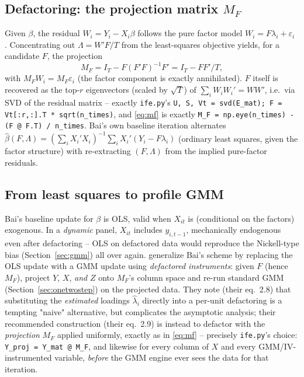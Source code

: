 \documentclass[11pt,a4paper]{article}
\begin{document}
\subsection{\texorpdfstring{Defactoring: the projection matrix $M_F$}{Defactoring: the projection matrix M\_F}}

Given $\beta$, the residual $W_i=Y_i-X_i\beta$ follows the pure factor model
$W_i=F\lambda_i+\varepsilon_i$ \citep[eq.\ 9]{Bai2009}. Concentrating out
$\Lambda=W'F/T$ from the least-squares objective yields, for a candidate
$F$, the projection
\begin{equation}
  M_F = I_T - F(F'F)^{-1}F' = I_T - FF'/T, \label{eq:mf}
\end{equation}
\citep[Section 3.2]{Bai2009} with $M_FW_i=M_F\varepsilon_i$ (the factor
component is exactly annihilated). $F$ itself is recovered as the top-$r$
eigenvectors (scaled by $\sqrt T$) of $\sum_iW_iW_i' = WW'$, i.e.\ via SVD of
the residual matrix -- exactly \texttt{ife.py}'s
\texttt{U, S, Vt = svd(E\_mat); F = Vt[:r,:].T * sqrt(n\_times)}, and
\eqref{eq:mf} is exactly \texttt{M\_F = np.eye(n\_times) - (F @ F.T) / n\_times}.
Bai's own baseline iteration alternates
$\hat\beta(F,\Lambda)=\left(\sum_iX_i'X_i\right)^{-1}\sum_iX_i'(Y_i-F\lambda_i)$
(ordinary least squares, given the factor structure) with re-extracting
$(F,\Lambda)$ from the implied pure-factor residuals.

\subsection{From least squares to profile GMM}

Bai's baseline update for $\beta$ is OLS, valid when $X_{it}$ is (conditional
on the factors) exogenous. In a \emph{dynamic} panel, $X_{it}$ includes
$y_{i,t-1}$, mechanically endogenous even after defactoring -- OLS on
defactored data would reproduce the Nickell-type bias
(Section~\ref{sec:gmm}) all over again. \citet{HongSuJiang2022} generalize
Bai's scheme by replacing the OLS update with a GMM update using
\emph{defactored instruments}: given $F$ (hence $M_F$), project $Y$, $X$,
\emph{and} $Z$ onto $M_F$'s column space and re-run standard GMM
(Section~\ref{sec:onetwostep}) on the projected data. They note (their eq.\
2.8) that substituting the \emph{estimated} loadings $\hat\lambda_i$
directly into a per-unit defactoring is a tempting "naive" alternative, but
complicates the asymptotic analysis; their recommended construction (their
eq.\ 2.9) is instead to defactor with the \emph{projection} $M_F$ applied
uniformly, exactly as in \eqref{eq:mf} -- precisely \texttt{ife.py}'s choice:
\texttt{Y\_proj = Y\_mat @ M\_F}, and likewise for every column of $X$ and
every GMM/IV-instrumented variable, \emph{before} the GMM engine ever sees
the data for that iteration.
\end{document}
